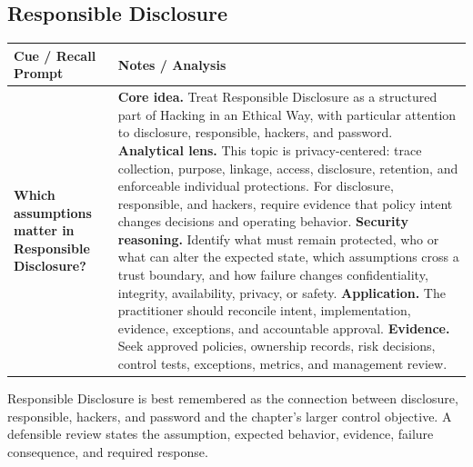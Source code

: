 \documentclass[11pt]{article}
\newcommand{\CornellHeader}{%
\rowcolor{Navy}\color{white}\bfseries Cue / Recall Prompt & \color{white}\bfseries Notes / Analysis\\\hline}
\newcommand{\CornellRow}[2]{%
\cellcolor{CueGray}\RaggedRight\textbf{#1} & \RaggedRight #2\\\hline}
\begin{document}
\subsection*{Responsible Disclosure}
\begin{longtable}{>{\RaggedRight\arraybackslash}p{}|>{\RaggedRight\arraybackslash}p{}}
\CornellHeader
\CornellRow{Which assumptions matter in Responsible Disclosure?}{\textbf{Core idea.} Treat Responsible Disclosure as a structured part of Hacking in an Ethical Way, with particular attention to disclosure, responsible, hackers, and password. \textbf{Analytical lens.} This topic is privacy-centered: trace collection, purpose, linkage, access, disclosure, retention, and enforceable individual protections. For disclosure, responsible, and hackers, require evidence that policy intent changes decisions and operating behavior. \textbf{Security reasoning.} Identify what must remain protected, who or what can alter the expected state, which assumptions cross a trust boundary, and how failure changes confidentiality, integrity, availability, privacy, or safety. \textbf{Application.} The practitioner should reconcile intent, implementation, evidence, exceptions, and accountable approval. \textbf{Evidence.} Seek approved policies, ownership records, risk decisions, control tests, exceptions, metrics, and management review.}
\end{longtable}
\begin{topicsummary}
Responsible Disclosure is best remembered as the connection between disclosure, responsible, hackers, and password and the chapter's larger control objective. A defensible review states the assumption, expected behavior, evidence, failure consequence, and required response.
\end{topicsummary}
\end{document}
